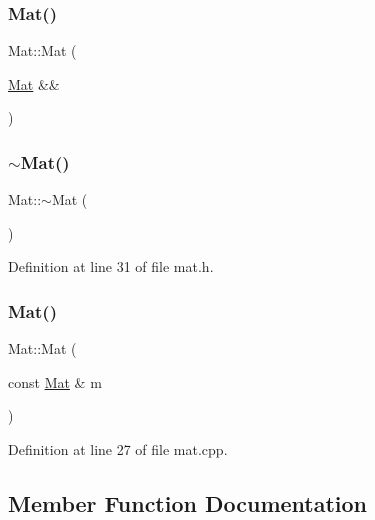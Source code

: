 \subsubsection{\texorpdfstring{Mat()}{Mat()}\hspace{0.1cm}{\footnotesize\ttfamily [4/5]}}
{\footnotesize\ttfamily Mat\+::\+Mat (\begin{DoxyParamCaption}\item[{\mbox{\hyperlink{class_mat}{Mat}} \&\&}]{ }\end{DoxyParamCaption})\hspace{0.3cm}{\ttfamily [default]}}

\mbox{\label{class_mat_a87836525bb8e60bda57d246b7370b97e}} 
\subsubsection{\texorpdfstring{$\sim$Mat()}{~Mat()}}
{\footnotesize\ttfamily Mat\+::$\sim$\+Mat (\begin{DoxyParamCaption}{ }\end{DoxyParamCaption})\hspace{0.3cm}{\ttfamily [inline]}}



Definition at line 31 of file mat.\+h.

\mbox{\label{class_mat_a1e30e252a1e556ac5e131edac7b08a23}} 
\subsubsection{\texorpdfstring{Mat()}{Mat()}\hspace{0.1cm}{\footnotesize\ttfamily [5/5]}}
{\footnotesize\ttfamily Mat\+::\+Mat (\begin{DoxyParamCaption}\item[{const \mbox{\hyperlink{class_mat}{Mat}} \&}]{m }\end{DoxyParamCaption})}



Definition at line 27 of file mat.\+cpp.



\subsection{Member Function Documentation}
\mbox{\label{class_mat_a3fc332affd01fd294aa98550b88c819d}} 
